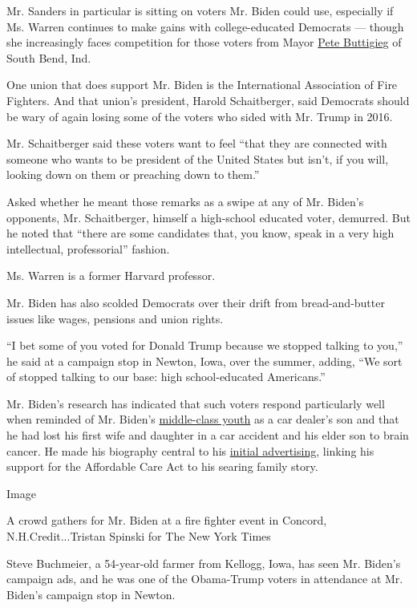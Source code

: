 Mr. Sanders in particular is sitting on voters Mr. Biden could use,
especially if Ms. Warren continues to make gains with college-educated
Democrats --- though she increasingly faces competition for those voters
from Mayor
\href{https://www.nytimes3xbfgragh.onion/interactive/2020/us/elections/pete-buttigieg.html}{Pete
Buttigieg} of South Bend, Ind.

One union that does support Mr. Biden is the International Association
of Fire Fighters. And that union's president, Harold Schaitberger, said
Democrats should be wary of again losing some of the voters who sided
with Mr. Trump in 2016.

Mr. Schaitberger said these voters want to feel ``that they are
connected with someone who wants to be president of the United States
but isn't, if you will, looking down on them or preaching down to
them.''

Asked whether he meant those remarks as a swipe at any of Mr. Biden's
opponents, Mr. Schaitberger, himself a high-school educated voter,
demurred. But he noted that ``there are some candidates that, you know,
speak in a very high intellectual, professorial'' fashion.

Ms. Warren is a former Harvard professor.

Mr. Biden has also scolded Democrats over their drift from
bread-and-butter issues like wages, pensions and union rights.

``I bet some of you voted for Donald Trump because we stopped talking to
you,'' he said at a campaign stop in Newton, Iowa, over the summer,
adding, ``We sort of stopped talking to our base: high school-educated
Americans.''

Mr. Biden's research has indicated that such voters respond particularly
well when reminded of Mr. Biden's
\href{https://www.nytimes3xbfgragh.onion/2008/10/24/us/politics/24biden.html}{middle-class
youth} as a car dealer's son and that he had lost his first wife and
daughter in a car accident and his elder son to brain cancer. He made
his biography central to his
\href{https://www.nytimes3xbfgragh.onion/2019/08/27/us/politics/joe-biden-ad-personal.html}{initial
advertising}, linking his support for the Affordable Care Act to his
searing family story.

Image

A crowd gathers for Mr. Biden at a fire fighter event in Concord,
N.H.Credit...Tristan Spinski for The New York Times

Steve Buchmeier, a 54-year-old farmer from Kellogg, Iowa, has seen Mr.
Biden's campaign ads, and he was one of the Obama-Trump voters in
attendance at Mr. Biden's campaign stop in Newton.

